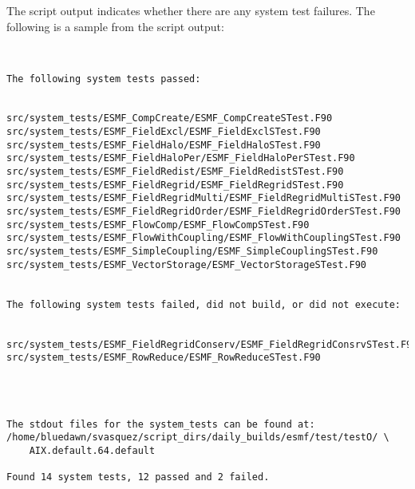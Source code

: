 The script output indicates whether there are any system test failures.
The following is a sample from the script output:

\begin{verbatim}


The following system tests passed:


src/system_tests/ESMF_CompCreate/ESMF_CompCreateSTest.F90
src/system_tests/ESMF_FieldExcl/ESMF_FieldExclSTest.F90
src/system_tests/ESMF_FieldHalo/ESMF_FieldHaloSTest.F90
src/system_tests/ESMF_FieldHaloPer/ESMF_FieldHaloPerSTest.F90
src/system_tests/ESMF_FieldRedist/ESMF_FieldRedistSTest.F90
src/system_tests/ESMF_FieldRegrid/ESMF_FieldRegridSTest.F90
src/system_tests/ESMF_FieldRegridMulti/ESMF_FieldRegridMultiSTest.F90
src/system_tests/ESMF_FieldRegridOrder/ESMF_FieldRegridOrderSTest.F90
src/system_tests/ESMF_FlowComp/ESMF_FlowCompSTest.F90
src/system_tests/ESMF_FlowWithCoupling/ESMF_FlowWithCouplingSTest.F90
src/system_tests/ESMF_SimpleCoupling/ESMF_SimpleCouplingSTest.F90
src/system_tests/ESMF_VectorStorage/ESMF_VectorStorageSTest.F90


The following system tests failed, did not build, or did not execute:


src/system_tests/ESMF_FieldRegridConserv/ESMF_FieldRegridConsrvSTest.F90
src/system_tests/ESMF_RowReduce/ESMF_RowReduceSTest.F90




The stdout files for the system_tests can be found at:
/home/bluedawn/svasquez/script_dirs/daily_builds/esmf/test/testO/ \
	AIX.default.64.default

Found 14 system tests, 12 passed and 2 failed.


\end{verbatim}

